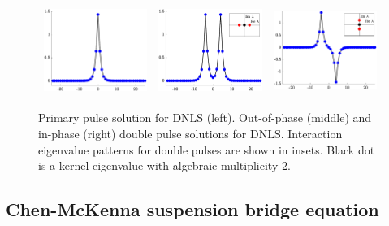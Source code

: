 \documentclass[12pt,reqno,oneside,hidelinks]{article}
\begin{document}
\begin{figure}
    \centering
    \begin{tabular}{ccc}
        \includegraphics[width=5cm]{images/DNLSprimary.eps} &
        \includegraphics[width=5cm]{images/DNLSunstable2p.eps} &
        \includegraphics[width=5cm]{images/DNLSstable2p.eps} 
    \end{tabular}
    \caption{Primary pulse solution for DNLS (left). Out-of-phase (middle) and in-phase (right) double pulse solutions for DNLS. Interaction eigenvalue patterns for double pulses are shown in insets. Black dot is a kernel eigenvalue with algebraic multiplicity 2.}
    \label{fig:DNLS2p}
\end{figure}


\subsection*{Chen-McKenna suspension bridge equation}
\end{document}
